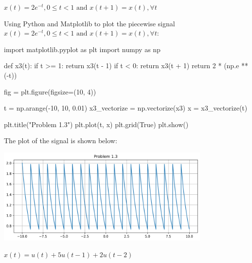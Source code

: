 \documentclass[a4paper, 10pt]{article}
\begin{document}
\begin{tosubmit}
\begin{subproblems}[start=3]
    \item \( x(t) = 2e^{-t}, 0 \leq t < 1 \text{ and } x(t + 1) = x(t), \forall t \)
\end{subproblems}

\begin{solution}
Using Python and Matplotlib to plot the piecewise signal \( x(t) = 2e^{-t}, 0 \leq t < 1 \text{ and } x(t + 1) = x(t), \forall t \):
\begin{codingbox}
import matplotlib.pyplot as plt
import numpy as np

def x3(t):
    if t >= 1:
        return x3(t - 1)
    if t < 0:
        return x3(t + 1)
    return 2 * (np.e ** (-t))

fig = plt.figure(figsize=(10, 4))

t = np.arange(-10, 10, 0.01)
x3_vectorize = np.vectorize(x3)
x = x3_vectorize(t)

plt.title("Problem 1.3")
plt.plot(t, x)
plt.grid(True)
plt.show()
\end{codingbox}

The plot of the signal is shown below:
\begin{center}
    \includegraphics[width=0.8\textwidth]{images/problem_1_3.png}
\end{center}
\end{solution}
\end{tosubmit}

\newpage

\begin{subproblems}[start=4]
    \item \( x(t) = u(t) + 5u(t - 1) + 2u(t - 2) \)
\end{subproblems}
\end{document}
